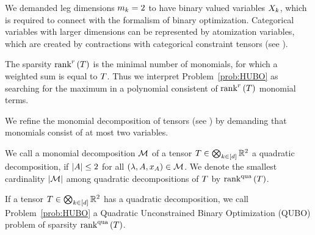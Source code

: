 \begin{remark}
    We demanded leg dimensions $m_{k}=2$ to have binary valued variables $X_{k}$, which is required to connect with the formalism of binary optimization.
    Categorical variables with larger dimensions can be represented by atomization variables, which are created by contractions with categorical constraint tensors (see ).
\end{remark}


The sparsity $\mathrm{rank}^{r}\left(T\right)$ is the minimal number of monomials, for which a weighted sum is equal to $T$.
Thus we interpret Problem~\ref{prob:HUBO} as searching for the maximum in a polynomial consistent of $\mathrm{rank}^{r}\left(T\right)$ monomial terms.





We refine the monomial decomposition of tensors (see ) by demanding that monomials consist of at most two variables.

\begin{definition}
    We call a monomial decomposition $\mathcal{M}$ of a tensor $T\in\bigotimes_{k\in[d]}\mathbb{R}^2$ a quadratic decomposition, if $\left|A\right|\leq 2$ for all $(\lambda,A,x_{A}) \in \mathcal{M}$.
    We denote the smallest cardinality $\left|\mathcal{M}\right|$ among quadratic decompositions of $T$ by $\mathrm{rank}^{\mathrm{qua}}\left(T\right)$.

    If a tensor $T\in\bigotimes_{k\in[d]}\mathbb{R}^2$ has a quadratic decomposition, we call Problem~\ref{prob:HUBO} a Quadratic Unconstrained Binary Optimization (QUBO) problem of sparsity $\mathrm{rank}^{\mathrm{qua}}\left(T\right)$.
\end{definition}


